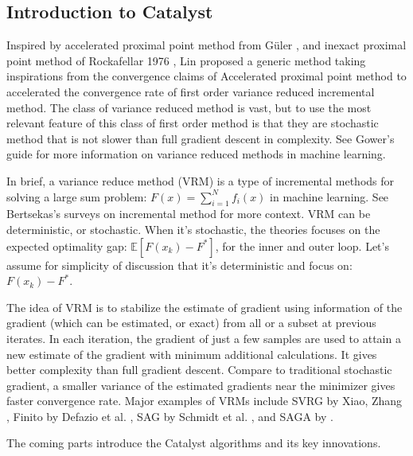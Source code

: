 \documentclass[12pt]{article}
\begin{document}
    \subsection{Introduction to Catalyst}\label{ssec:catalyst-intro}
        Inspired by accelerated proximal point method from Güler \cite{guler_new_1992}, and inexact proximal point method of Rockafellar 1976 \cite{rockafellar_monotone_1976}, Lin \cite{lin_universal_2015} proposed a generic method taking inspirations from the convergence claims of Accelerated proximal point method to accelerated the convergence rate of first order variance reduced incremental method. 
        The class of variance reduced method is vast, but to use the most relevant feature of this class of first order method is that they are stochastic method that is not slower than full gradient descent in complexity. 
        See Gower's guide \cite{gower_variance-reduced_2020} for more information on variance reduced methods in machine learning. 
        \par
        In brief, a variance reduce method (VRM) is a type of 
        incremental methods
        for solving a large sum problem: $F(x) = \sum_{i = 1}^{N} f_i(x)$ in machine learning.
        See Bertsekas's surveys \cite{bertsekas_incremental_2011,bertsekas_incremental_2017} on incremental method for more context. 
        VRM can be deterministic, or stochastic. 
        When it's stochastic, the theories focuses on the expected optimality gap: $\mathbb E[F(x_k) - F^*]$, for the inner and outer loop. 
        Let's assume for simplicity of discussion that it's deterministic and focus on: $F(x_k) - F^*$. 
        \par 
        The idea of VRM is to stabilize the estimate of gradient using information of the gradient (which can be estimated, or exact) from all or a subset at previous iterates. 
        In each iteration, the gradient of just a few samples are used to attain a new estimate of the gradient with minimum additional calculations.  It gives better complexity than full gradient descent. 
        Compare to traditional stochastic gradient, a smaller variance of the estimated gradients near the minimizer gives faster convergence rate. 
        Major examples of VRMs include SVRG by Xiao, Zhang \cite{xiao_proximal_2014}, Finito by Defazio et al. \cite{defazio_finito_2014}, SAG by Schmidt et al. \cite{schmidt_minimizing_2017}, and SAGA by \cite{defazio_saga_2014}. 
        \par
        The coming parts introduce the Catalyst algorithms and its key innovations. 
\end{document}
